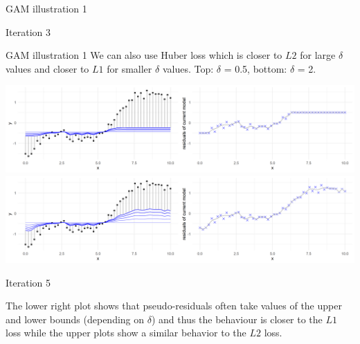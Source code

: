 \begin{frame}{GAM illustration 1}
{\vfill

Iteration 3
}

\end{frame}


\begin{frame}{GAM illustration 1}
We can also use Huber loss which is closer to $L2$ for large $\delta$ values and closer to $L1$ for 
smaller $\delta$ values. Top: $\delta$ = 0.5, bottom: $\delta$ = 2.

\vfill

\includegraphics[width=\textwidth]{figure/illustration_gaussian_huber_05_5.png}
\includegraphics[width=\textwidth]{figure/illustration_gaussian_huber_2_5.png}

\vfill

Iteration 5

\vfill

The lower right plot shows that pseudo-residuals often take values of the upper and lower
bounds (depending on $\delta$) and thus the behaviour is closer to the $L1$ loss while the upper plots show a
similar behavior to the $L2$ loss. 

\end{frame}

